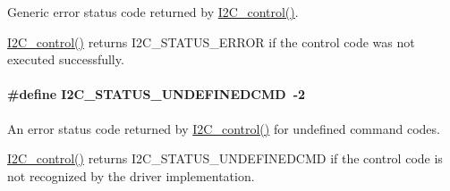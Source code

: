 Generic error status code returned by \hyperlink{_i2_c_8h_a633003582213a5098467a4e647cc52f9}{I2\+C\+\_\+control()}. 

\hyperlink{_i2_c_8h_a633003582213a5098467a4e647cc52f9}{I2\+C\+\_\+control()} returns I2\+C\+\_\+\+S\+T\+A\+T\+U\+S\+\_\+\+E\+R\+R\+O\+R if the control code was not executed successfully. 
\paragraph[{I2\+C\+\_\+\+S\+T\+A\+T\+U\+S\+\_\+\+U\+N\+D\+E\+F\+I\+N\+E\+D\+C\+M\+D}]{\setlength{\rightskip}{0pt plus 5cm}\#define I2\+C\+\_\+\+S\+T\+A\+T\+U\+S\+\_\+\+U\+N\+D\+E\+F\+I\+N\+E\+D\+C\+M\+D~-\/2}\label{group___i2_c___s_t_a_t_u_s_ga11c31c9869ed2441789205d9e5967d66}


An error status code returned by \hyperlink{_i2_c_8h_a633003582213a5098467a4e647cc52f9}{I2\+C\+\_\+control()} for undefined command codes. 

\hyperlink{_i2_c_8h_a633003582213a5098467a4e647cc52f9}{I2\+C\+\_\+control()} returns I2\+C\+\_\+\+S\+T\+A\+T\+U\+S\+\_\+\+U\+N\+D\+E\+F\+I\+N\+E\+D\+C\+M\+D if the control code is not recognized by the driver implementation. 